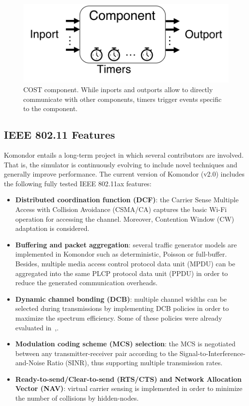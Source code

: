 \documentclass{article}
\begin{document}
	\begin{figure}[h!]
		\centering
		\includegraphics[width=0.7\columnwidth]{cost_component.png}
		\caption{COST component. While inports and outports allow to directly communicate with other components, timers trigger events specific to the component.}
		\label{fig:cost}
	\end{figure}	
	
	\subsection{IEEE 802.11 Features}
	\label{subsection:features}
    Komondor entails a long-term project in which several contributors are involved. That is, the simulator is continuously evolving to include novel techniques and generally improve performance. The current version of Komondor (v2.0) includes the following fully tested IEEE 802.11ax features:
	\begin{itemize}
		\item \textbf{Distributed coordination function (DCF)}: the Carrier Sense Multiple Access with Collision Avoidance (CSMA/CA) captures the basic Wi-Fi operation for accessing the channel. Moreover, Contention Window (CW) adaptation is considered.
		\item \textbf{Buffering and packet aggregation}: several traffic generator models are implemented in Komondor such as deterministic, Poisson or full-buffer. Besides, multiple media access control protocol data unit (MPDU) can be aggregated into the same PLCP protocol data unit (PPDU) in order to reduce the generated communication overheads.
		\item \textbf{Dynamic channel bonding (DCB)}: multiple channel widths can be selected during transmissions by implementing DCB policies in order to maximize the spectrum efficiency. Some of these policies were already evaluated in~\cite{barrachina2019dynamic},\cite{barrachina2019overlap}.
		\item\textbf{Modulation coding scheme (MCS) selection}: the MCS is negotiated between any transmitter-receiver pair according to the Signal-to-Interference-and-Noise Ratio (SINR), thus supporting multiple transmission rates.
		\item \textbf{Ready-to-send/Clear-to-send (RTS/CTS) and Network Allocation Vector (NAV)}: virtual carrier sensing is implemented in order to minimize the number of collisions by hidden-nodes.
	\end{itemize}
	
\end{document}
